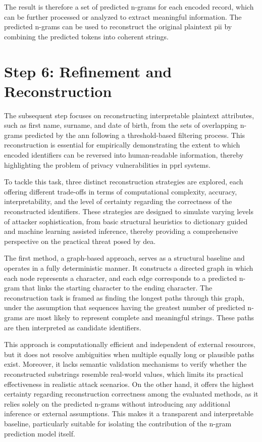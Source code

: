 The result is therefore a set of predicted n-grams for each encoded record, which can be further processed or analyzed to extract meaningful information.
The predicted n-grams can be used to reconstruct the original plaintext \ac{pii} by combining the predicted tokens into coherent strings.

\section{Step 6: Refinement and Reconstruction} \label{sec:refinementandreconstruction}

The subsequent step focuses on reconstructing interpretable plaintext attributes, such as first name, surname, and date of birth, from the sets of overlapping n-grams predicted by the \ac{ann} following a threshold-based filtering process.
This reconstruction is essential for empirically demonstrating the extent to which encoded identifiers can be reversed into human-readable information, thereby highlighting the problem of privacy vulnerabilities in \ac{pprl} systems.

To tackle this task, three distinct reconstruction strategies are explored, each offering different trade-offs in terms of computational complexity, accuracy, interpretability, and the level of certainty regarding the correctness of the reconstructed identifiers.
These strategies are designed to simulate varying levels of attacker sophistication, from basic structural heuristics to dictionary guided and machine learning assisted inference, thereby providing a comprehensive perspective on the practical threat posed by \ac{dea}.

The first method, a graph-based approach, serves as a structural baseline and operates in a fully deterministic manner.
It constructs a directed graph in which each node represents a character, and each edge corresponds to a predicted n-gram that links the starting character to the ending character.
The reconstruction task is framed as finding the longest paths through this graph, under the assumption that sequences having the greatest number of predicted n-grams are most likely to represent complete and meaningful strings.
These paths are then interpreted as candidate identifiers.

This approach is computationally efficient and independent of external resources, but it does not resolve ambiguities when multiple equally long or plausible paths exist.
Moreover, it lacks semantic validation mechanisms to verify whether the reconstructed substrings resemble real-world values, which limits its practical effectiveness in realistic attack scenarios.
On the other hand, it offers the highest certainty regarding reconstruction correctness among the evaluated methods, as it relies solely on the predicted n-grams without introducing any additional inference or external assumptions.
This makes it a transparent and interpretable baseline, particularly suitable for isolating the contribution of the n-gram prediction model itself.

